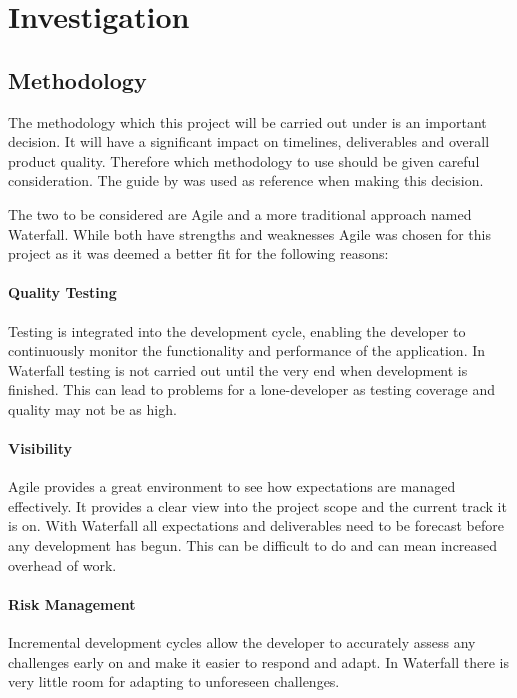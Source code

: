 \section{Investigation}

\subsection{Methodology}
\label{subs:agile}

The methodology which this project will be carried out under is an important decision. It will have a significant impact on timelines, deliverables and overall product quality. Therefore which methodology to use should be given careful consideration. The guide by \citep{Manifesto2016} was used as reference when making this decision.

The two to be considered are Agile and a more traditional approach named Waterfall. While both have strengths and weaknesses Agile was chosen for this project as it was deemed a better fit for the following reasons:

\paragraph{Quality Testing} Testing is integrated into the development cycle, enabling the developer to continuously monitor the functionality and performance of the application. In Waterfall testing is not carried out until the very end when development is finished. This can lead to problems for a lone-developer as testing coverage and quality may not be as high. 

\paragraph{Visibility} Agile provides a great environment to see how expectations are managed effectively. It provides a clear view into the project scope and the current track it is on. With Waterfall all expectations and deliverables need to be forecast before any development has begun. This can be difficult to do and can mean increased overhead of work.

\paragraph{Risk Management} Incremental development cycles allow the developer to accurately assess any challenges early on and make it easier to respond and adapt. In Waterfall there is very little room for adapting to unforeseen challenges.

